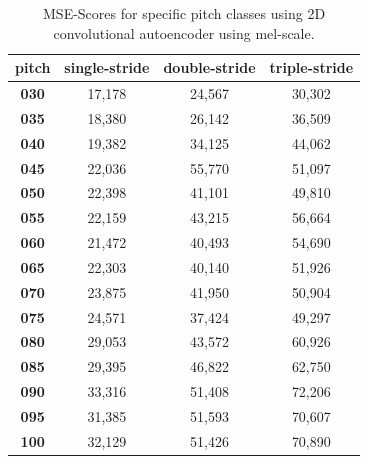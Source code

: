 \begin{table}[htb!]
\centering
\begin{tabular}{|c|c|c|c|}
\hline
\textbf{pitch} & \textbf{single-stride} & \textbf{double-stride} & \textbf{triple-stride} \\ \hline
\textbf{030}   & 17,178                 & 24,567                 & 30,302                 \\ \hline
\textbf{035}   & 18,380                 & 26,142                 & 36,509                 \\ \hline
\textbf{040}   & 19,382                 & 34,125                 & 44,062                 \\ \hline
\textbf{045}   & 22,036                 & 55,770                 & 51,097                 \\ \hline
\textbf{050}   & 22,398                 & 41,101                 & 49,810                 \\ \hline
\textbf{055}   & 22,159                 & 43,215                 & 56,664                 \\ \hline
\textbf{060}   & 21,472                 & 40,493                 & 54,690                 \\ \hline
\textbf{065}   & 22,303                 & 40,140                 & 51,926                 \\ \hline
\textbf{070}   & 23,875                 & 41,950                 & 50,904                 \\ \hline
\textbf{075}   & 24,571                 & 37,424                 & 49,297                 \\ \hline
\textbf{080}   & 29,053                 & 43,572                 & 60,926                 \\ \hline
\textbf{085}   & 29,395                 & 46,822                 & 62,750                 \\ \hline
\textbf{090}   & 33,316                 & 51,408                 & 72,206                 \\ \hline
\textbf{095}   & 31,385                 & 51,593                 & 70,607                 \\ \hline
\textbf{100}   & 32,129                 & 51,426                 & 70,890                 \\ \hline
\end{tabular}
\caption{MSE-Scores for specific pitch classes using 2D convolutional autoencoder using mel-scale.}
\label{tab:res_scores_2D_pitch_mel}
\end{table}

